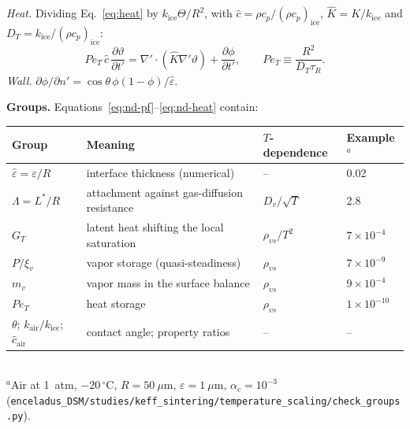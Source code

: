 \documentclass[11pt]{article}
\newcommand{\ice}{\mathrm{ice}}
\newcommand{\air}{\mathrm{air}}
\newcommand{\rvs}{\rho_{vs}}
\newcommand{\eh}{\hat\varepsilon}
\newcommand{\pd}[2]{\frac{\partial #1}{\partial #2}}
\begin{document}
\emph{Heat.} Dividing Eq.~\eqref{eq:heat} by $k_\ice\Theta/R^{2}$, with
$\hat c = \rho c_p/(\rho c_p)_\ice$, $\hat K = K/k_\ice$ and $D_T =
k_\ice/(\rho c_p)_\ice$:
\begin{equation}
Pe_T\,\hat c\,\pd{\vartheta}{t'} = \nabla'\cdot(\hat K\nabla'\vartheta) + \pd{\phi}{t'} ,\qquad Pe_T \equiv \frac{R^{2}}{D_T\tau_{R}} .
\label{eq:nd-heat}
\end{equation}
\emph{Wall.} $\partial\phi/\partial n' = \cos\theta\,\phi(1-\phi)/\eh$.

\textbf{Groups.} Equations~\eqref{eq:nd-pf}--\eqref{eq:nd-heat} contain:

\begin{center}\footnotesize\setlength{\tabcolsep}{4pt}\begin{tabular}{llll}\toprule
Group & Meaning & $T$-dependence & Example$^{a}$\\\midrule
$\eh = \varepsilon/R$ & interface thickness (numerical) & -- & 0.02\\
$\Lambda = L^{*}/R$ & attachment against gas-diffusion resistance & $D_v/\sqrt T$ & 2.8\\
$G_T$ & latent heat shifting the local saturation & $\rvs/T^{2}$ & $7\times10^{-4}$\\
$P/\xi_v$ & vapor storage (quasi-steadiness) & $\rvs$ & $7\times10^{-9}$\\
$m_v$ & vapor mass in the surface balance & $\rvs$ & $9\times10^{-4}$\\
$Pe_T$ & heat storage & $\rvs$ & $1\times10^{-10}$\\
$\theta$; $k_\air/k_\ice$; $\hat c_\air$ & contact angle; property ratios & -- & --\\\bottomrule
\end{tabular}\\[0.3ex]
{\footnotesize $^{a}$Air at 1~atm, $-20\,^{\circ}$C, $R = 50~\mu$m, $\varepsilon = 1~\mu$m, $\alpha_c = 10^{-3}$
(\texttt{enceladus\_DSM/studies/keff\_sintering/temperature\_scaling/check\_groups.py}).}
\end{center}
\end{document}
